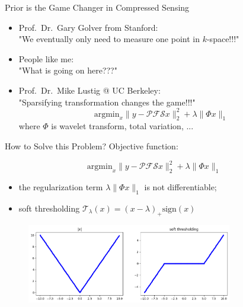\begin{frame}{Prior is the Game Changer in Compressed Sensing}
	\begin{itemize}
		\item <1-> Prof.~Dr.~Gary Golver from Stanford:\\
		"We eventually only need to measure one point in $k$-space!!!"
		\vspace{1em}
		\item <2->People like me:\\
		"What is going on here???"
		\vspace{1em}
		\item <3-> Prof.~Dr.~Mike Lustig @ UC Berkeley:\\
		"Sparsifying transformation changes the game!!!"
		\begin{equation}
			\mathrm{argmin}_x \lVert y -  \mathcal{P} \mathcal{F} \mathcal{S} x \rVert_2^2 + \lambda \lVert \Phi x \rVert_1
		\end{equation}
		where $\Phi$ is wavelet transform, total variation, ...
	\end{itemize}


\end{frame}


\begin{frame}{How to Solve this Problem?}
	Objective function:

	\begin{equation}
		\mathrm{argmin}_x \lVert y -  \mathcal{P} \mathcal{F} \mathcal{S} x \rVert_2^2 + \lambda \lVert \Phi x \rVert_1
	\end{equation}

	\begin{itemize}
		\item the regularization term $\lambda \lVert \Phi x \rVert_1$ is not differentiable;
		\item soft thresholding $\mathcal{T}_\lambda(x) = (x - \lambda)_+ \mathrm{sign}(x)$
	\end{itemize}

	\begin{figure}
		\centering
		\includegraphics[width=0.8\textwidth]{fig/soft_thresh.png}
	\end{figure}

\end{frame}


